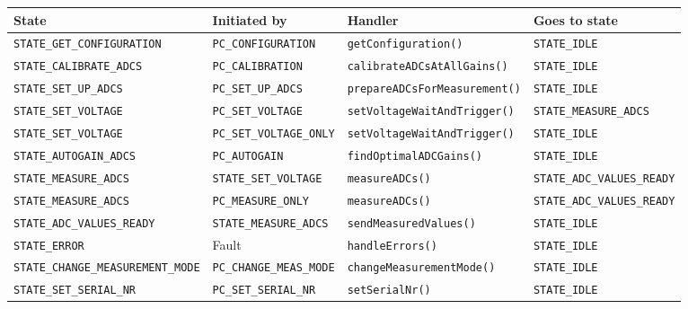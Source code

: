 \documentclass[11pt,a4paper,english]{article}
\begin{document}
\small
\hskip-1.3cm\begin{tabular}{llll}\toprule
State					        & Initiated by                 & Handler                            & Goes to state        \\\midrule
\texttt{STATE\_GET\_CONFIGURATION} & \texttt{PC\_CONFIGURATION}    & \texttt{getConfiguration()}    & \texttt{STATE\_IDLE}\\
\texttt{STATE\_CALIBRATE\_ADCS} & \texttt{PC\_CALIBRATION}     & \texttt{calibrateADCsAtAllGains()} & \texttt{STATE\_IDLE}\\
\texttt{STATE\_SET\_UP\_ADCS}   & \texttt{PC\_SET\_UP\_ADCS}   & \texttt{prepareADCsForMeasurement()} & \texttt{STATE\_IDLE} \\
\texttt{STATE\_SET\_VOLTAGE}    & \texttt{PC\_SET\_VOLTAGE}    & \texttt{setVoltageWaitAndTrigger()}       & \texttt{STATE\_MEASURE\_ADCS}\\
\texttt{STATE\_SET\_VOLTAGE}    & \texttt{PC\_SET\_VOLTAGE\_ONLY}    & \texttt{setVoltageWaitAndTrigger()}       & \texttt{STATE\_IDLE}\\
\texttt{STATE\_AUTOGAIN\_ADCS}  & \texttt{PC\_AUTOGAIN}        & \texttt{findOptimalADCGains()}     & \texttt{STATE\_IDLE} \\
\texttt{STATE\_MEASURE\_ADCS}   & \texttt{STATE\_SET\_VOLTAGE} & \texttt{measureADCs()}   & \texttt{STATE\_ADC\_VALUES\_READY}\\
\texttt{STATE\_MEASURE\_ADCS}   & \texttt{PC\_MEASURE\_ONLY} & \texttt{measureADCs()}   & \texttt{STATE\_ADC\_VALUES\_READY}\\
\texttt{STATE\_ADC\_VALUES\_READY} & \texttt{STATE\_MEASURE\_ADCS} & \texttt{sendMeasuredValues()}  & \texttt{STATE\_IDLE}\\
\texttt{STATE\_ERROR}           & Fault                        & \texttt{handleErrors()}            & \texttt{STATE\_IDLE}\\
\texttt{STATE\_CHANGE\_MEASUREMENT\_MODE} & \texttt{PC\_CHANGE\_MEAS\_MODE} & \texttt{changeMeasurementMode()}  & \texttt{STATE\_IDLE}\\
\texttt{STATE\_SET\_SERIAL\_NR} & \texttt{PC\_SET\_SERIAL\_NR} & \texttt{setSerialNr()}  & \texttt{STATE\_IDLE}\\
\bottomrule
\end{tabular}
\end{document}
